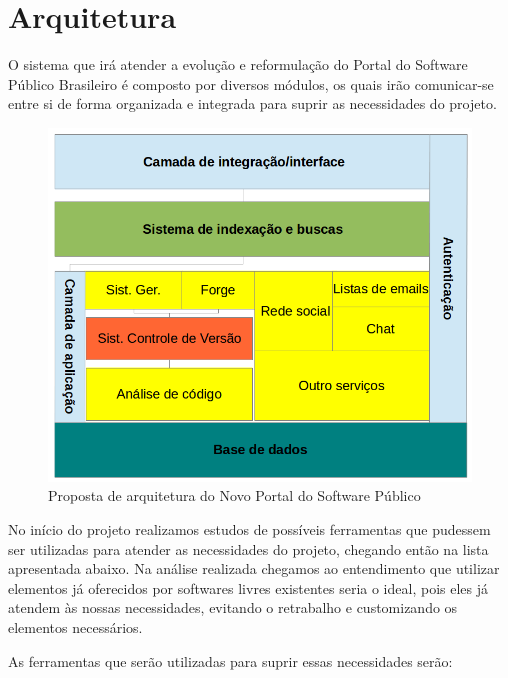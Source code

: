 ﻿\section{Arquitetura}
\label{sec:arquitetura}

O sistema que irá atender a evolução e reformulação do Portal do Software Público Brasileiro é composto por diversos módulos, os quais irão comunicar-se entre si de forma organizada e integrada para suprir as necessidades do projeto.
%

\begin{figure}[htpb]
  \begin{center}
    \includegraphics[width=.37\textwidth]{images/visao_arq.png}
  \end{center}
  \caption{Proposta de arquitetura do Novo Portal do Software Público}
  \label{fig:core_concurrent}
\end{figure}
No início do projeto realizamos estudos de possíveis ferramentas que pudessem ser utilizadas para atender as necessidades do projeto, chegando então na lista apresentada abaixo.
Na análise realizada chegamos ao entendimento que utilizar elementos já oferecidos por softwares livres existentes seria o ideal, pois eles já atendem às nossas necessidades, evitando o retrabalho e customizando os elementos necessários.   

As ferramentas que serão utilizadas para suprir essas necessidades serão:

